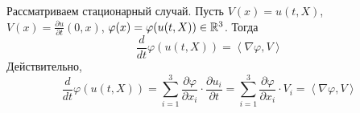Рассматриваем стационарный случай.
Пусть $V(x) = u(t,X)$, $V(x) = \frac{\partial u}{\partial t}(0,x)$, $\varphi(x) = \varphi(u(t,X)) \in \mathbb{R}^3$.
Тогда
\begin{equation} \label{grad-phi-V}
	\frac{d}{dt}\varphi (u(t,X)) = \left< \nabla \varphi , V\right>
\end{equation}
Действительно,
\begin{equation*}
	\frac{d}{dt}\varphi (u(t,X)) =
	\sum\limits_{i=1}^{3} \frac{\partial \varphi}{\partial x_i} \cdot \frac{\partial u_i}{\partial t} =
	\sum\limits_{i=1}^{3} \frac{\partial \varphi}{\partial x_i} \cdot V_i =
	\left< \nabla\varphi , V \right>
\end{equation*}
